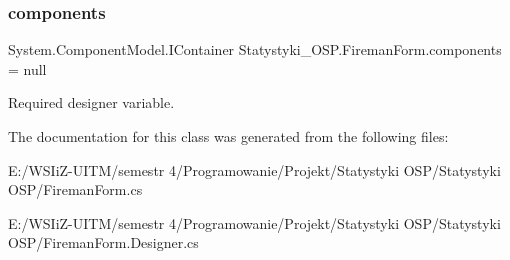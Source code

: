 \subsubsection{\texorpdfstring{components}{components}}
{\footnotesize\ttfamily System.\+Component\+Model.\+I\+Container Statystyki\+\_\+\+O\+S\+P.\+Fireman\+Form.\+components = null\hspace{0.3cm}{\ttfamily [private]}}



Required designer variable. 



The documentation for this class was generated from the following files\+:\begin{DoxyCompactItemize}
\item 
E\+:/\+W\+S\+Ii\+Z-\/\+U\+I\+T\+M/semestr 4/\+Programowanie/\+Projekt/\+Statystyki O\+S\+P/\+Statystyki O\+S\+P/Fireman\+Form.\+cs\item 
E\+:/\+W\+S\+Ii\+Z-\/\+U\+I\+T\+M/semestr 4/\+Programowanie/\+Projekt/\+Statystyki O\+S\+P/\+Statystyki O\+S\+P/Fireman\+Form.\+Designer.\+cs\end{DoxyCompactItemize}
